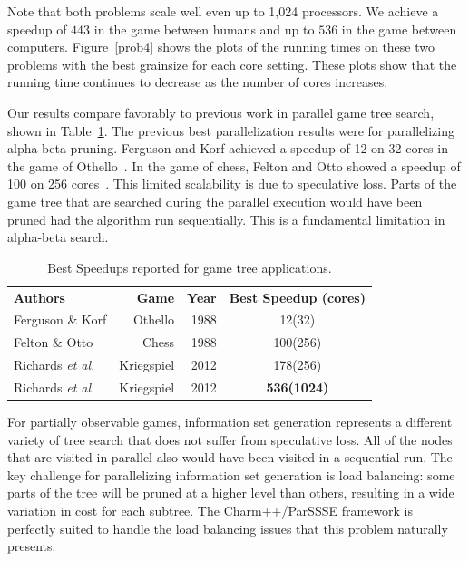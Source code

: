 \documentclass[10pt, conference, compsocconf]{IEEEtran}
\newcommand{\etal}{{\em et al.}\ }
\begin{document}
Note that both problems scale well even up to 1,024 processors.  We achieve a
speedup of $443$ in the game between humans and up to $536$ in the game between
computers.  Figure~\ref{prob4} shows the plots of the running
times on these two problems with the best grainsize for each core setting.  These plots show that the
running time continues to decrease as the number of cores increases.

Our results compare favorably to previous work in parallel game tree search,
shown in Table~\ref{bestspeedups}.  The previous best parallelization results
were for parallelizing alpha-beta pruning.  Ferguson and Korf achieved a
speedup of 12 on 32 cores in the game of Othello~\cite{ferguson88distributed}.
In the game of chess, Felton and Otto showed a speedup of 100 on 256
cores~\cite{felten88highly}.  This limited scalability is due to speculative
loss.  Parts of the game tree that are searched during the parallel execution
would have been pruned had the algorithm run sequentially.  This is a
fundamental limitation in alpha-beta search. 

\begin{table}[ht]
\caption{Best Speedups reported for game tree applications.}
\centering
\begin{tabular}{lrrc}
{\bf Authors} & {\bf Game} & {\bf Year} & {\bf Best Speedup (cores)} \\
Ferguson \& Korf & Othello & 1988 & 12(32) \\
Felton \& Otto & Chess & 1988 & 100(256) \\
Richards \etal & Kriegspiel & 2012 & 178(256) \\
Richards \etal & Kriegspiel & 2012 & {\bf 536(1024)} \\
\end{tabular}
\label{bestspeedups}
\end{table}

For partially observable games, information set generation represents a
different variety of tree search that does not suffer from speculative loss.
All of the nodes that are visited in parallel also would have been visited in a
sequential run.  The key challenge for parallelizing information set generation
is load balancing: some parts of the tree will be pruned at a higher level than
others, resulting in a wide variation in cost for each subtree.  The {\sc
Charm++/ParSSSE} framework is perfectly suited to handle the load balancing
issues that this problem naturally presents.
\end{document}
